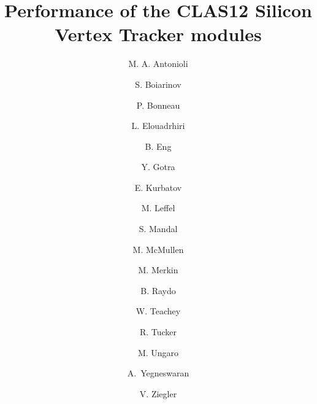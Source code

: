 \title{Performance of the CLAS12 Silicon Vertex Tracker modules}

\author[A]{M. A. Antonioli}
\author[A]{S. Boiarinov}
\author[A]{P. Bonneau}
\author[A]{L. Elouadrhiri}
\author[A]{B. Eng}
\author[A]{Y. Gotra}
\author[B]{E. Kurbatov}
\author[A]{M. Leffel}
\author[A]{S. Mandal}
\author[A]{M. McMullen}
\author[B]{M. Merkin}
\author[A]{B. Raydo}
\author[A]{W. Teachey}
\author[C]{R. Tucker}
\author[A]{M. Ungaro}
\author[A]{A.~Yegneswaran}
\author[A]{V. Ziegler}
\address[A]{Thomas Jefferson National Accelerator Facility, Newport News, VA, USA}
\address[B]{Skobeltsyn Institute of Nuclear Physics, Moscow State University, Moscow, Russia}
\address[C]{Arizona State University, Tempe, AZ}
